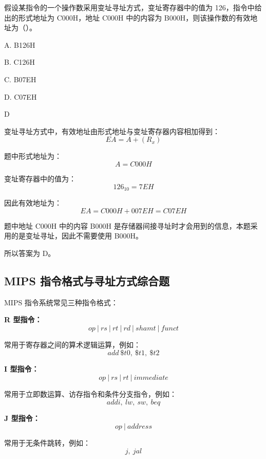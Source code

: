 \begin{question}
假设某指令的一个操作数采用变址寻址方式，变址寄存器中的值为 126，指令中给出的形式地址为 C000H，地址 C000H 中的内容为 B000H，则该操作数的有效地址为（）。

A. B126H

B. C126H

C. B07EH

D. C07EH
\end{question}

\begin{answer}
D
\end{answer}

\begin{analysisenv}
变址寻址方式中，有效地址由形式地址与变址寄存器内容相加得到：
\[
EA = A + (R_x)
\]

题中形式地址为：
\[
A = C000H
\]

变址寄存器中的值为：
\[
126_{10} = 7EH
\]

因此有效地址为：
\[
EA = C000H + 007EH = C07EH
\]

题中地址 C000H 中的内容 B000H 是存储器间接寻址时才会用到的信息，本题采用的是变址寻址，因此不需要使用 B000H。

所以答案为 D。
\end{analysisenv}







\subsection{MIPS 指令格式与寻址方式综合题}

\begin{knowledge}
MIPS 指令系统常见三种指令格式：

\textbf{R 型指令：}
\[
op\ |\ rs\ |\ rt\ |\ rd\ |\ shamt\ |\ funct
\]

常用于寄存器之间的算术逻辑运算，例如：
\[
add\ \$t0,\ \$t1,\ \$t2
\]

\textbf{I 型指令：}
\[
op\ |\ rs\ |\ rt\ |\ immediate
\]

常用于立即数运算、访存指令和条件分支指令，例如：
\[
addi,\ lw,\ sw,\ beq
\]

\textbf{J 型指令：}
\[
op\ |\ address
\]

常用于无条件跳转，例如：
\[
j,\ jal
\]
\end{knowledge}


